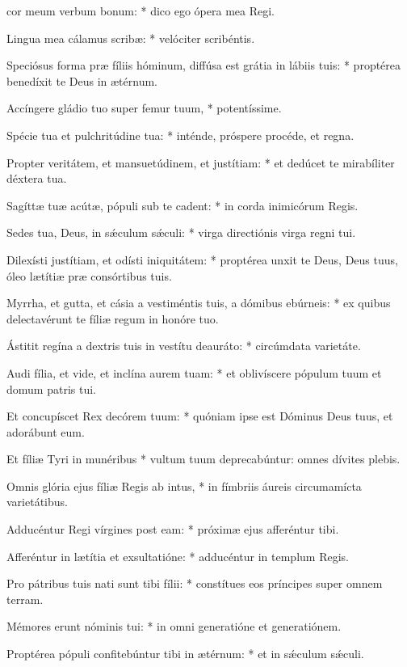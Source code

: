 \begin{psalmus}
    
 cor meum verbum bonum: * dico ego ópera mea Regi.
    
Lingua mea cálamus scribæ: * velóciter scribéntis.

Speciósus forma præ fíliis hóminum, diffúsa est grátia in lábiis tuis: * proptérea benedíxit te Deus in ætérnum.

Accíngere gládio tuo super femur tuum, * potentíssime.

Spécie tua et pulchritúdine tua: * inténde, próspere procéde, et regna.

Propter veritátem, et mansuetúdinem, et justítiam: * et dedúcet te mirabíliter déxtera tua.

Sagíttæ tuæ acútæ, pópuli sub te cadent: * in corda inimicórum Regis.

Sedes tua, Deus, in sǽculum sǽculi: * virga directiónis virga regni tui.

Dilexísti justítiam, et odísti iniquitátem: * proptérea unxit te Deus, Deus tuus, óleo lætítiæ præ consórtibus tuis.

Myrrha, et gutta, et cásia a vestiméntis tuis, a dómibus ebúrneis: * ex quibus delectavérunt te fíliæ regum in honóre tuo.

Ástitit regína a dextris tuis in vestítu deauráto: * circúmdata varietáte.

Audi fília, et vide, et inclína aurem tuam: * et oblivíscere pópulum tuum et domum patris tui.

Et concupíscet Rex decórem tuum: * quóniam ipse est Dóminus Deus tuus, et adorábunt eum.

Et fíliæ Tyri in munéribus * vultum tuum deprecabúntur: omnes dívites plebis.

Omnis glória ejus fíliæ Regis ab intus, * in fímbriis áureis circumamícta varietátibus.

Adducéntur Regi vírgines post eam: * próximæ ejus afferéntur tibi.

Afferéntur in lætítia et exsultatióne: * adducéntur in templum Regis.

Pro pátribus tuis nati sunt tibi fílii: * con\-stí\-tu\-es eos prín\-ci\-pes super omnem terram.

Mémores erunt nóminis tui: * in omni generatióne et generatiónem.

Proptérea pópuli confitebúntur tibi in ætérnum: * et in sǽculum sǽculi.

\end{psalmus}
